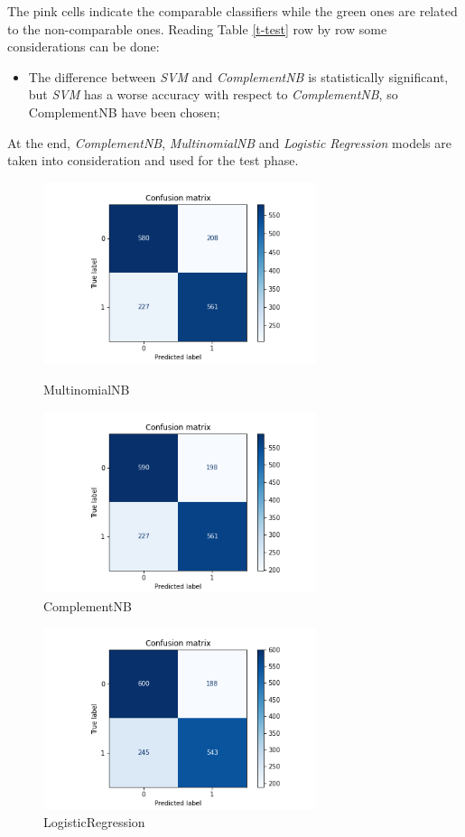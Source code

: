 \noindent
The pink cells indicate the comparable classifiers while the green ones are related to the non-comparable ones. Reading Table \ref{t-test} row by row some considerations can be done:
\begin{itemize}
    \item The difference between \emph{SVM} and \emph{ComplementNB} is statistically significant, but \emph{SVM} has a worse accuracy with respect to \emph{ComplementNB}, so ComplementNB have been chosen;
\end{itemize}

\noindent
At the end, \emph{ComplementNB}, \emph{MultinomialNB} and \emph{Logistic Regression} models are taken into consideration and used for the test phase. 

\begin{figure}[h]
\centering
\begin{minipage}[c]{0.48\textwidth}
\centering
\includegraphics[width=8cm]{images/training/MultinomialNB-confusion_matrix.png}
\caption{MultinomialNB}
\end{minipage}
\begin{minipage}[c]{0.48\textwidth}
\centering
\includegraphics[width=8cm]{images/training/ComplementNB-confusion_matrix.png}
\caption{ComplementNB}
\end{minipage}
\end{figure}


\begin{figure}[H]
\centering
\includegraphics[width=8cm]{images/training/Logistic Regression-confusion_matrix.png}
\caption{LogisticRegression}
\end{figure}


